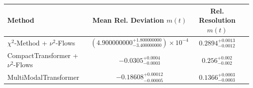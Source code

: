     \begin{tabular}{lccc}
        \toprule
        Method & Mean Rel. Deviation $m(t)$ & Rel. Resolution $m(t)$ \\
        \midrule
        $\chi^2$-Method + $\nu^2$-Flows & $(4.900000000^{+1.800000000}_{-3.400000000})\times 10^{-4}$ & $0.2894^{+0.0013}_{-0.0012}$ \\
        CompactTransformer + $\nu^2$-Flows & $-0.0305^{+0.0004}_{-0.0003}$ & $0.256^{+0.002}_{-0.002}$ \\
        MultiModalTransformer & $-0.18608^{+0.00012}_{-0.00005}$ & $0.1366^{+0.0003}_{-0.0003}$ \\
        \bottomrule
    \end{tabular}